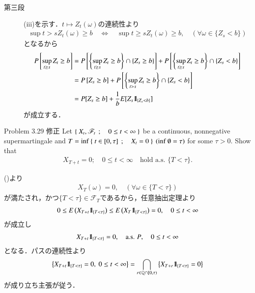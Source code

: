 \begin{prf}
\begin{description}
			\item[第三段]
				(iii)を示す．$t \longmapsto Z_t(\omega)$の連続性より
				\begin{align}
					\sup{t > s}{Z_t(\omega)} \geq b 
					\quad \Leftrightarrow \quad
					\sup{t \geq s}{Z_t(\omega)} \geq b,
					\quad (\forall \omega \in \{Z_s < b\})
				\end{align}
				となるから
				\begin{align}
					P\left[ \operatorname*{sup}_{t \geq s} Z_t \geq b \right]
					&= P\left[ \left\{ \operatorname*{sup}_{t \geq s} Z_t \geq b \right\} \cap \{Z_s \geq b\} \right]
						+ P\left[ \left\{ \operatorname*{sup}_{t \geq s} Z_t \geq b \right\} \cap \{Z_s < b\} \right] \\
					&= P\left[ Z_s \geq b \right]
						+ P\left[ \left\{ \operatorname*{sup}_{t > s} Z_t \geq b \right\} \cap \{Z_s < b\} \right] \\
					&= P[Z_s \geq b] + \frac{1}{b} E[Z_s \mbox{1}\hspace{-0.25em}\mbox{l}_{\{Z_s < b\}}]
				\end{align}
				が成立する．
				\QED
		\end{description}
	\end{prf}
	
	\begin{itembox}[l]{Problem 3.29 修正}
		Let $\left\{\ X_t,\mathscr{F}_t\ \, ; \quad 0 \leq t < \infty\ \right\}$ be a continuous, nonnegative supermartingale
		and $T = \inf{}{\Set{t \in [0,\tau]}{X_t = 0}}\ (\inf{}{\emptyset} = \tau)$ for some $\tau > 0$.
		Show that
		\begin{align}
			X_{T + t} = 0; \quad 0 \leq t < \infty \quad \mbox{hold a.s. $\{T < \tau\}$}.
		\end{align}
	\end{itembox}
	
	\begin{prf}
		()より
		\begin{align}
			X_T(\omega) = 0,
			\quad (\forall \omega \in \{T < \tau\})
		\end{align}
		が満たされ，かつ$\{T < \tau\} \in \mathscr{F}_T$であるから，任意抽出定理より
		\begin{align}
			0 \leq E\left( X_{T+t} \mbox{1}\hspace{-0.25em}\mbox{l}_{\{T < \tau\}} \right) \leq E\left( X_T \mbox{1}\hspace{-0.25em}\mbox{l}_{\{T < \tau\}} \right) = 0,
			\quad 0 \leq t < \infty
		\end{align}
		が成立し
		\begin{align}
			X_{T+t} \mbox{1}\hspace{-0.25em}\mbox{l}_{\{T < \tau\}} = 0,
			\quad \mbox{a.s. $P$},
			\quad 0 \leq t < \infty
		\end{align}
		となる．パスの連続性より
		\begin{align}
			\left\{ X_{T+t} \mbox{1}\hspace{-0.25em}\mbox{l}_{\{T < \tau\}} = 0,\ 0 \leq t < \infty \right\}
			= \bigcap_{r \in \mathbb{Q} \cap [0,\tau)} \left\{ X_{T+r} \mbox{1}\hspace{-0.25em}\mbox{l}_{\{T < \tau\}} = 0 \right\}
		\end{align}
		が成り立ち主張が従う．
		\QED
	\end{prf}
	
